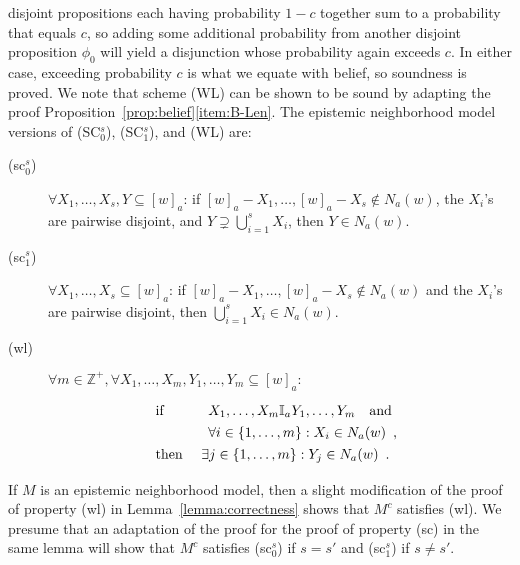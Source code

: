 \documentclass[12pt]{article}
\theoremstyle{definition}
\newcommand{\Int}{\mathbb{Z}}  %
\begin{document}
\begin{enumerate}
disjoint propositions each having probability $1-c$ together sum to a
probability that equals $c$, so adding some additional probability
from another disjoint proposition $\phi_0$ will yield a disjunction whose
probability again exceeds $c$.  In either case, exceeding probability
$c$ is what we equate with belief, so soundness is proved.  We note
that scheme (WL) can be shown to be sound by adapting the proof
Proposition~\ref{prop:belief}\eqref{item:B-Len}.  The epistemic
neighborhood model versions of (SC$_0^s$), (SC$_1^s$), and (WL) are:
\begin{description}
\item[(sc$_0^s$)] $\forall X_1,\dots,X_s,Y\subseteq[w]_a$:
  if $[w]_a-X_1,\dots,[w]_a-X_s\notin N_a(w)$,
  the $X_i$'s are pairwise disjoint, and $Y\supsetneq\bigcup_{i=1}^sX_i$,
  then $Y\in N_a(w)$.

\item[(sc$_1^s$)] $\forall X_1,\dots,X_s\subseteq[w]_a$: if
  $[w]_a-X_1,\dots,[w]_a-X_s\notin N_a(w)$ and the $X_i$'s are
  pairwise disjoint, then $\bigcup_{i=1}^sX_i\in N_a(w)$.
 
\item[(wl)] $\forall m\in\Int^+,\forall
  X_1,\dots,X_m,Y_1,\dots,Y_m\subseteq[w]_a:$
  \[
  \renewcommand{\arraystretch}{1.3}
  \begin{array}{ll}
    \text{if }
    &
    \begin{array}[t]{l}
      X_1,\dots,X_m\mathbb{I}_aY_1,\dots,Y_m\quad\text{and}
      \\
      \forall i\in\{1,\dots,m\}:
      X_i\in N_a(w) \enspace\text{,}
    \end{array}
    \\
    \text{then }
    &
    \exists j\in\{1,\dots,m\}: Y_j\in N_a(w)\enspace\text{.}
  \end{array}
  \]
\end{description}
If $M$ is an epistemic neighborhood model, then a slight modification
of the proof of property (wl) in Lemma~\ref{lemma:correctness} shows
that $M^c$ satisfies (wl).  We presume that an adaptation of the proof
for the proof of property (sc) in the same lemma will show that $M^c$
satisfies (sc$_0^s$) if $s=s'$ and (sc$_1^s$) if $s\neq s'$.


\end{enumerate}
\end{document}
